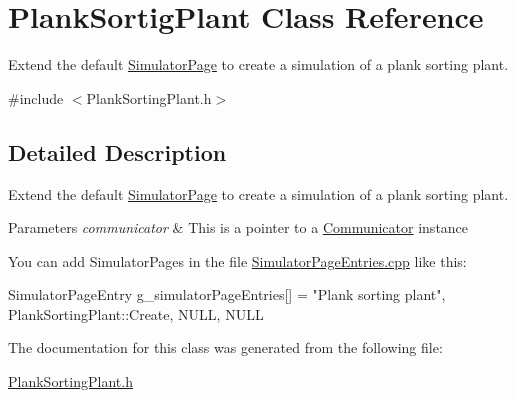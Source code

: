 \hypertarget{classPlankSortigPlant}{\section{\-Plank\-Sortig\-Plant \-Class \-Reference}
\label{classPlankSortigPlant}
}


\-Extend the default \hyperlink{classSimulatorPage}{\-Simulator\-Page} to create a simulation of a plank sorting plant.  




{\ttfamily \#include $<$\-Plank\-Sorting\-Plant.\-h$>$}



\subsection{\-Detailed \-Description}
\-Extend the default \hyperlink{classSimulatorPage}{\-Simulator\-Page} to create a simulation of a plank sorting plant. 


\begin{DoxyParams}{\-Parameters}
{\em communicator} & \-This is a pointer to a \hyperlink{classCommunicator}{\-Communicator} instance\\
\hline
\end{DoxyParams}
\-You can add \-Simulator\-Pages in the file \hyperlink{SimulatorPageEntries_8cpp}{\-Simulator\-Page\-Entries.\-cpp} like this\-: 
\begin{DoxyCode}
        SimulatorPageEntry g_simulatorPageEntries[] =
        {
        {"Plank sorting plant", PlankSortingPlant::Create},
        {NULL, NULL}
        }
\end{DoxyCode}
 

\-The documentation for this class was generated from the following file\-:\begin{DoxyCompactItemize}
\item 
\hyperlink{PlankSortingPlant_8h}{\-Plank\-Sorting\-Plant.\-h}\end{DoxyCompactItemize}
